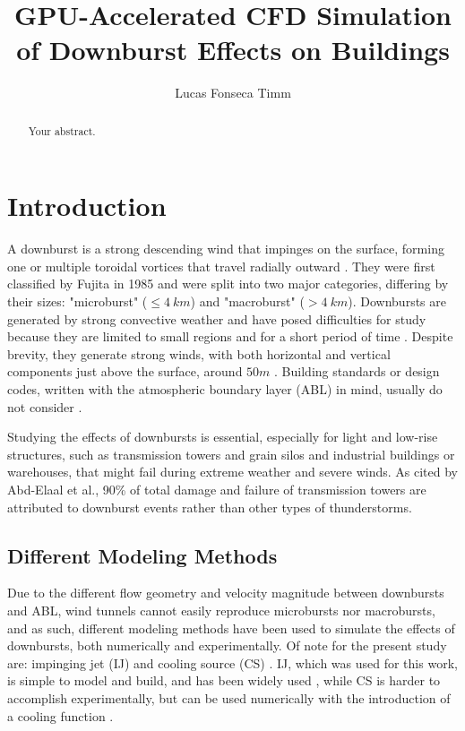 \documentclass{article}
\title{GPU-Accelerated CFD Simulation of Downburst Effects on Buildings}
\author{Lucas Fonseca Timm}
\begin{document}
\maketitle

\newpage
\begin{abstract}
Your abstract.
\end{abstract}

\section{Introduction}
A downburst is a strong descending wind that impinges on the surface, forming one or multiple toroidal vortices that travel radially outward \cite{canepa}\cite{zhang}. They were first classified by Fujita\cite{fujita} in 1985 and were split into two major categories, differing by their sizes: "microburst" ($\leq 4\ km$) and "macroburst" ($> 4\ km$). Downbursts are generated by strong convective weather \cite{zhang} and have posed difficulties for study because they are limited to small regions and for a short period of time \cite{mason2009} \cite{aboshosha2015} \cite{mejia2022} \cite{yao2024} \cite{solari2020}. Despite brevity, they generate strong winds, with both horizontal and vertical components just above the surface, around $50m$ \cite{kim} \cite{aboshosha2015}. Building standards or design codes, written with the atmospheric boundary layer (ABL) in mind, usually do not consider \cite{chay} \cite{sengupta}.

Studying the effects of downbursts is essential, especially for light and low-rise structures, such as transmission towers and grain silos and industrial buildings or warehouses, that might fail during extreme weather and severe winds\cite{zhang2014}. As cited by Abd-Elaal et al.\cite{sayed}, 90\% of total damage and failure of transmission towers are attributed to downburst events rather than other types of thunderstorms. 


\subsection{Different Modeling Methods}
Due to the different flow geometry and velocity magnitude between downbursts and ABL, wind tunnels cannot easily reproduce microbursts nor macrobursts, and as such, different modeling methods have been used to simulate the effects of downbursts, both numerically and experimentally. Of note for the present study are: impinging jet (IJ) and cooling source (CS) \cite{zhang2}\cite{solari2020}. IJ, which was used for this work, is simple to model and build, and has been widely used \cite{solari2020}, while CS is harder to accomplish experimentally, but can be used numerically with the introduction of a cooling function \cite{zhang2}. 
\end{document}
